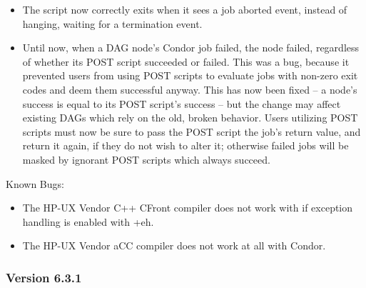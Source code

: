 \begin{itemize}
\item
The  script now correctly exits when it sees a job aborted
event, instead of hanging, waiting for a termination event.

\item
Until now, when a DAG node's Condor job failed, the node failed,
regardless of whether its POST script succeeded or failed.  This was a
bug, because it prevented users from using POST scripts to evaluate
jobs with non-zero exit codes and deem them successful anyway.  This
has now been fixed -- a node's success is equal to its POST script's
success -- but the change may affect existing DAGs which rely on the
old, broken behavior.  Users utilizing POST scripts must now be sure
to pass the POST script the job's return value, and return it again,
if they do not wish to alter it; otherwise failed jobs will be masked
by ignorant POST scripts which always succeed.

\end{itemize}

\noindent Known Bugs:

\begin{itemize}
\item The HP-UX Vendor C++ CFront compiler does not work with 
if exception handling is enabled with +eh.

\item The HP-UX Vendor aCC compiler does not work at all with Condor.
\end{itemize}

\subsubsection{\label{sec:New-6-3-1}Version 6.3.1}

